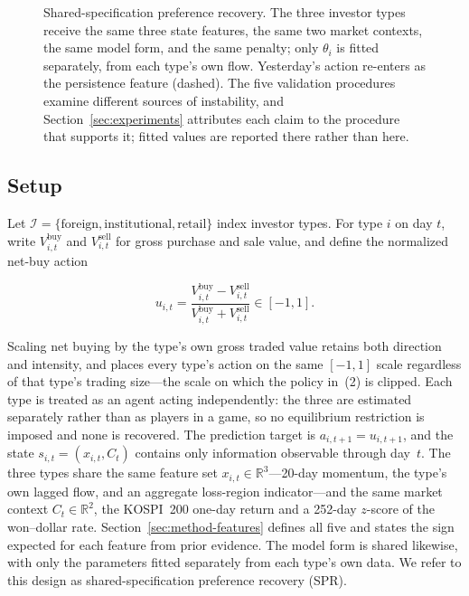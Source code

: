 \documentclass[sigconf,anonymous,review]{acmart}
\begin{document}
\begin{figure}[t]
{\begin{tikzpicture}
\end{tikzpicture}}
\caption{Shared-specification preference recovery. The three investor
types receive the same three state features, the same two market
contexts, the same model form, and the same penalty; only $\theta_i$ is
fitted separately, from each type's own flow. Yesterday's action re-enters
as the persistence feature (dashed). The five validation procedures
examine different sources of instability, and
Section~\ref{sec:experiments} attributes each claim to the procedure that
supports it; fitted values are reported there rather than here.}
\label{fig:pipeline}
\end{figure}

\subsection{Setup}
\label{sec:method-setup}

Let $\mathcal{I} = \{\textrm{foreign}, \textrm{institutional},
\textrm{retail}\}$ index investor types. For type $i$ on day $t$, write
$V^{\mathrm{buy}}_{i,t}$ and $V^{\mathrm{sell}}_{i,t}$ for gross purchase
and sale value, and define the normalized net-buy action

\begin{equation}
  u_{i,t} = \frac{V^{\mathrm{buy}}_{i,t} - V^{\mathrm{sell}}_{i,t}}
                 {V^{\mathrm{buy}}_{i,t} + V^{\mathrm{sell}}_{i,t}}
          \in [-1, 1].
\end{equation}

Scaling net buying by the type's own gross traded value retains both
direction and intensity, and places every type's action on the same
$[-1,1]$ scale regardless of that type's trading size---the scale on
which the policy in~(2) is clipped. Each type is
treated as an agent acting independently: the three are estimated
separately rather than as players in a game, so no equilibrium
restriction is imposed and none is recovered. The prediction target is
$a_{i,t+1} = u_{i,t+1}$, and the state $s_{i,t} = (x_{i,t}, C_t)$
contains only information observable through day~$t$. The three types
share the same feature set $x_{i,t} \in \mathbb{R}^3$---20-day momentum,
the type's own lagged flow, and an aggregate loss-region indicator---and
the same market context $C_t \in \mathbb{R}^2$, the KOSPI~200 one-day
return and a 252-day $z$-score of the won--dollar rate.
Section~\ref{sec:method-features} defines all five and states the sign
expected for each feature from prior evidence. The model form is shared likewise,
with only the parameters fitted separately from each type's own data. We
refer to this design as shared-specification preference recovery (SPR).
\end{document}
